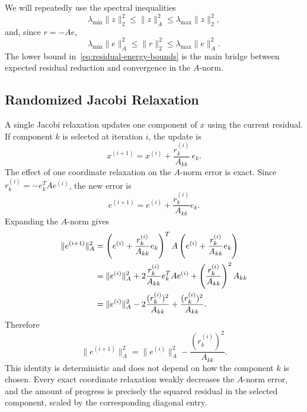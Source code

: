 \documentclass[pdflatex,sn-mathphys-num]{sn-jnl}%
\newcommand{\norm}[2]{\|#1\|_{#2}}
\newcommand{\Anorm}[1]{\|#1\|_{A}}
\newcommand{\lmin}{\lambda_{\min}}
\newcommand{\lmax}{\lambda_{\max}}
\theoremstyle{thmstyleone}%
\theoremstyle{thmstyletwo}%
\theoremstyle{thmstylethree}%
\begin{document}
We will repeatedly use the spectral inequalities
\[
    \lmin \norm{z}{2}^2
    \leq
    \Anorm{z}^2
    \leq
    \lmax \norm{z}{2}^2,
\]
and, since $r=-Ae$,
\begin{equation}
\label{eq:residual-energy-bounds}
    \lmin \Anorm{e}^2
    \leq
    \norm{r}{2}^2
    \leq
    \lmax \Anorm{e}^2.
\end{equation}
The lower bound in~\eqref{eq:residual-energy-bounds} is the main bridge between
expected residual reduction and convergence in the $A$-norm.


\subsection{Randomized Jacobi Relaxation}

A single Jacobi relaxation updates one component of $x$ using the current
residual.  If component $k$ is selected at iteration $i$, the update is
\begin{equation}
\label{eq:update}
    x^{(i+1)}
    =
    x^{(i)} + \frac{r_k^{(i)}}{A_{kk}}\, e_k .
\end{equation}
The effect of one coordinate relaxation on the $A$-norm error is exact.  Since
$r_k^{(i)} = -e_k^T A e^{(i)}$, the new error is
\[
    e^{(i+1)}
    =
    e^{(i)} + \frac{r_k^{(i)}}{A_{kk}} e_k .
\]
Expanding the $A$-norm gives
\begin{align}
    \Anorm{e^{(i+1)}}^2
    &=
    \left(e^{(i)} + \frac{r_k^{(i)}}{A_{kk}}e_k\right)^T
    A
    \left(e^{(i)} + \frac{r_k^{(i)}}{A_{kk}}e_k\right) \notag \\
    &=
    \Anorm{e^{(i)}}^2
    + 2\frac{r_k^{(i)}}{A_{kk}} e_k^T A e^{(i)}
    + \left(\frac{r_k^{(i)}}{A_{kk}}\right)^2 A_{kk} \notag \\
    &=
    \Anorm{e^{(i)}}^2
    - 2\frac{(r_k^{(i)})^2}{A_{kk}}
    + \frac{(r_k^{(i)})^2}{A_{kk}}.
\end{align}
Therefore
\begin{equation}
\label{eq:progress-identity}
    \Anorm{e^{(i+1)}}^2
    =
    \Anorm{e^{(i)}}^2
    -
    \frac{(r_k^{(i)})^2}{A_{kk}} .
\end{equation}
This identity is deterministic and does not depend on how the component $k$ is
chosen.  Every exact coordinate relaxation weakly decreases the $A$-norm error,
and the amount of progress is precisely the squared residual in the selected
component, scaled by the corresponding diagonal entry.
\end{document}
